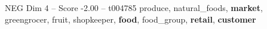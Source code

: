 \begin{textsample}{NEG Dim 4 – Score -2.00 – t004785}  \label{ex:f4_neg_035}
produce, natural\_foods, \textbf{market}, greengrocer, fruit, shopkeeper, \textbf{food}, food\_group, \textbf{retail}, \textbf{customer}

\end{textsample}
